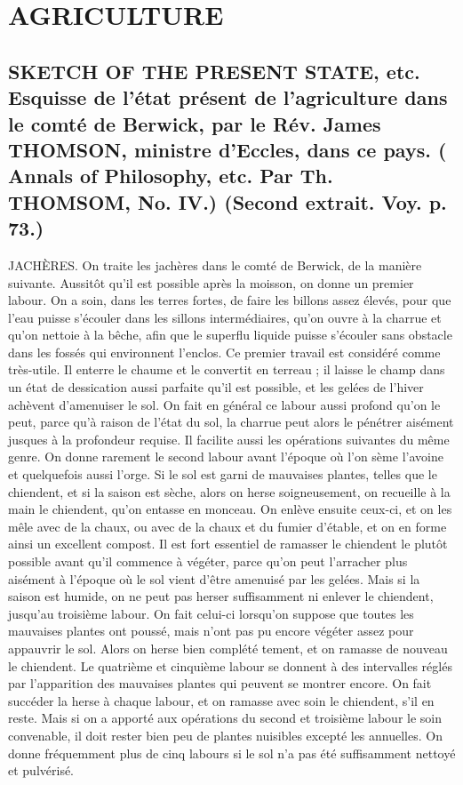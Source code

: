 \setcounter{page}{109}
\chapter{AGRICULTURE}
\section{SKETCH OF THE PRESENT STATE, etc. Esquisse de l'état présent de l'agriculture dans le comté de Berwick, par le Rév. James THOMSON, ministre d'Eccles, dans ce pays. ( Annals of Philosophy, etc. Par Th. THOMSOM, No. IV.) \large{(Second extrait. Voy. p. 73.)}}
JACHÈRES. On traite les jachères dans le comté de Berwick, de la manière suivante. Aussitôt qu'il est possible après la moisson, on donne un premier labour. On a soin, dans les terres fortes, de faire les billons assez élevés, pour que l'eau puisse s'écouler dans les sillons intermédiaires, qu'on ouvre à la charrue et qu'on nettoie à la bêche, afin que le superflu liquide puisse s'écouler sans obstacle dans les fossés qui environnent l'enclos. Ce premier travail est considéré comme très-utile. Il enterre le chaume et le convertit en terreau ; il laisse le champ dans un état de dessication aussi parfaite qu'il est possible\setcounter{page}{110}, et les gelées de l'hiver achèvent d'amenuiser le sol. On fait en général ce labour aussi profond qu'on le peut, parce qu'à raison de l'état du sol, la charrue peut alors le pénétrer aisément jusques à la profondeur requise. Il facilite aussi les opérations suivantes du même genre.
On donne rarement le second labour avant l'époque où l'on sème l'avoine et quelquefois aussi l'orge. Si le sol est garni de mauvaises plantes, telles que le chiendent, et si la saison est sèche, alors on herse soigneusement, on recueille à la main le chiendent, qu'on entasse en monceau. On enlève ensuite ceux-ci, et on les mêle avec de la chaux, ou avec de la chaux et du fumier d'étable, et on en forme ainsi un excellent compost. Il est fort essentiel de ramasser le chiendent le plutôt possible avant qu'il commence à végéter, parce qu'on peut l'arracher plus aisément à l'époque où le sol vient d'être amenuisé par les gelées. Mais si la saison est humide, on ne peut pas herser suffisamment ni enlever le chiendent, jusqu'au troisième labour.
On fait celui-ci lorsqu'on suppose que toutes les mauvaises plantes ont poussé, mais n'ont pas pu encore végéter assez pour appauvrir le sol. Alors on herse bien complété\setcounter{page}{111} tement, et on ramasse de nouveau le chiendent.
Le quatrième et cinquième labour se donnent à des intervalles réglés par l'apparition des mauvaises plantes qui peuvent se montrer encore. On fait succéder la herse à chaque labour, et on ramasse avec soin le chiendent, s'il en reste. Mais si on a apporté aux opérations du second et troisième labour le soin convenable, il doit rester bien peu de plantes nuisibles excepté les annuelles. On donne fréquemment plus de cinq labours si le sol n'a pas été suffisamment nettoyé et pulvérisé.

